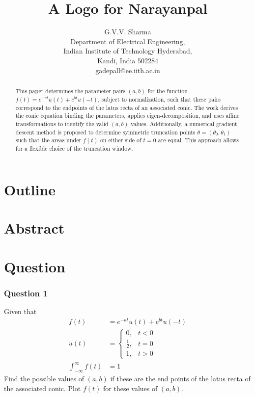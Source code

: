 \documentclass{beamer}
\title{A Logo for Narayanpal}
\author{
	G.V.V. Sharma \\
	Department of Electrical Engineering,\\
	Indian Institute of Technology Hyderabad,\\
	Kandi, India 502284\\
	gadepall@ee.iith.ac.in
}
\theoremstyle{remark}
\numberwithin{equation}{section}
\begin{document}
\begin{frame}
  \titlepage
\end{frame}

\section*{Outline}
\begin{frame}
  \tableofcontents
\end{frame}


\section{Abstract}
\begin{frame}

\begin{abstract}
	This paper determines the parameter pairs $(a, b)$ for the function $f(t) = e^{-at}u(t) + e^{bt}u(-t)$, subject to normalization, such that these pairs correspond to the endpoints of the latus recta of an associated conic. The work derives the conic equation binding the parameters, applies eigen-decomposition, and uses affine transformations to identify the valid $(a, b)$ values. Additionally, a numerical gradient descent method is proposed to determine symmetric truncation points $\theta = (\theta_0, \theta_1)$ such that the areas under $f(t)$ on either side of $t=0$ are equal. This approach allows for a flexible choice of the truncation window.
\end{abstract}
\end{frame}


\section{Question}
\begin{frame}
\frametitle{Question 1}
Given that
\begin{align}
		f(t) &= e^{-at}u(t) + e^{bt}u(-t) \label{q1}\\
		u(t) &= \begin{cases}
			0, & t<0\\
			\frac{1}{2}, & t=0 \\
			1, & t>0
		\end{cases} \label{q2}\\
		\int_{-\infty}^{\infty} f(t) &= 1 \label{q3}
	\end{align}
Find the possible values of $(a,b)$ if these are the end points of the latus recta of the associated conic. Plot $f(t)$ for these values of $(a,b)$.
\end{frame}
\end{document}
